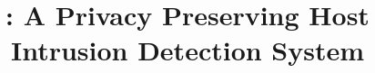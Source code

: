 \documentclass[conference,compsoc]{IEEEtran}
\begin{document}
\title{\Sys: A Privacy Preserving Host Intrusion Detection System}
\maketitle





% 





% 
% 
% 
% 

\balance

{
\footnotesize
\setlength{\bibsep}{3pt}
}

\end{document}
